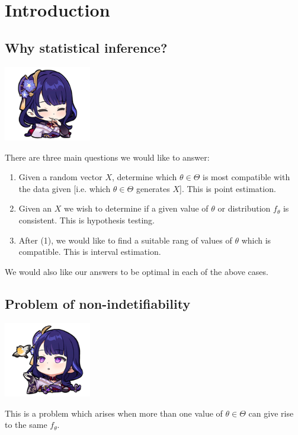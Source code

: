 \documentclass[oneside]{book}
\begin{document}
\begin{titlepage}
    
\end{titlepage}
\clearpage

\setmainfont{Indie Flower}

\tableofcontents


\chapter{Introduction}
\section{Why statistical inference?}
\begin{marginfigure}%
    \includegraphics[width=1.5in]{chibis/file_001.png}
\end{marginfigure}%
There are three main questions we would like to answer:
\begin{enumerate}
    \item Given a random vector $X$, determine which $\theta\in \Theta$ is most compatible with the data given [i.e. which $\theta\in\Theta$ generates $X$]. This is point estimation.
    \item Given an $X$ we wish to determine if a given value of $\theta$ or distribution $f_\theta$ is consistent. This is hypothesis testing.
    \item After (1), we would like to find a suitable rang of values of $\theta$ which is compatible. This is interval estimation.
\end{enumerate}
We would also like our answers to be optimal in each of the above cases. 

\section{Problem of non-indetifiability}
\begin{marginfigure}%
    \includegraphics[width=1.5in]{chibis/file_002.png}
\end{marginfigure}%
This is a problem which arises when more than one value of $\theta\in\Theta$ can give rise to the same $f_\theta$. 
\end{document}

